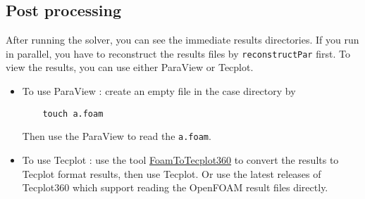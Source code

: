 \subsection{Post processing}
After running the solver, you can see the immediate results directories.
If you run in parallel, you have to reconstruct the results files by \verb|reconstructPar| first.
To view the results, you can use either ParaView or Tecplot.
\begin{itemize}
\item To use ParaView : create an empty file in the case directory by
\begin{verbatim}
    touch a.foam
\end{verbatim}
Then use the ParaView to read the \verb|a.foam|.
\item To use Tecplot : use the tool \href{https://openfoamwiki.net/index.php/FoamToTecplot360}{FoamToTecplot360} to convert the results to Tecplot format results, then use Tecplot.
 Or use the latest releases of Tecplot360 which support reading the OpenFOAM result files directly.
\end{itemize}

